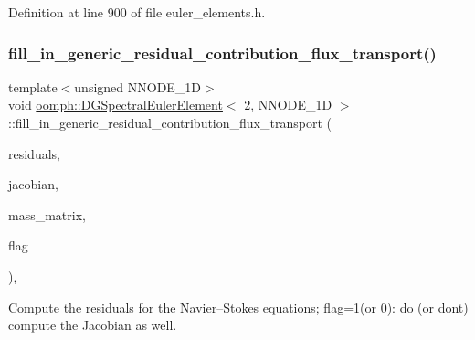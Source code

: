Definition at line 900 of file euler\+\_\+elements.\+h.

\mbox{\label{classoomph_1_1DGSpectralEulerElement_3_012_00_01NNODE__1D_01_4_a91aa95f61d0d91d89f3d899fbb4fdad3}} 
\subsubsection{\texorpdfstring{fill\+\_\+in\+\_\+generic\+\_\+residual\+\_\+contribution\+\_\+flux\+\_\+transport()}{fill\_in\_generic\_residual\_contribution\_flux\_transport()}}
{\footnotesize\ttfamily template$<$unsigned N\+N\+O\+D\+E\+\_\+1D$>$ \\
void \hyperlink{classoomph_1_1DGSpectralEulerElement}{oomph\+::\+D\+G\+Spectral\+Euler\+Element}$<$ 2, N\+N\+O\+D\+E\+\_\+1D $>$\+::fill\+\_\+in\+\_\+generic\+\_\+residual\+\_\+contribution\+\_\+flux\+\_\+transport (\begin{DoxyParamCaption}\item[{\hyperlink{classoomph_1_1Vector}{Vector}$<$ double $>$ \&}]{residuals,  }\item[{\hyperlink{classoomph_1_1DenseMatrix}{Dense\+Matrix}$<$ double $>$ \&}]{jacobian,  }\item[{\hyperlink{classoomph_1_1DenseMatrix}{Dense\+Matrix}$<$ double $>$ \&}]{mass\+\_\+matrix,  }\item[{unsigned}]{flag }\end{DoxyParamCaption})\hspace{0.3cm}{\ttfamily [inline]}, {\ttfamily [virtual]}}



Compute the residuals for the Navier--Stokes equations; flag=1(or 0)\+: do (or don\textquotesingle{}t) compute the Jacobian as well. 



